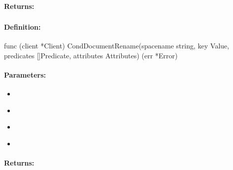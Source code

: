 \paragraph{Returns:}


\pagebreak
\subsubsection{}
\label{api:Go:CondDocumentRename}


\paragraph{Definition:}
\begin{gocode}
func (client *Client) CondDocumentRename(spacename string, key Value, predicates []Predicate, attributes Attributes) (err *Error)
\end{gocode}

\paragraph{Parameters:}
\begin{itemize}[noitemsep]
\item {}\\

\item {}\\

\item {}\\

\item {}\\

\end{itemize}

\paragraph{Returns:}


\pagebreak
\subsubsection{}
\label{api:Go:GroupDocumentRename}


